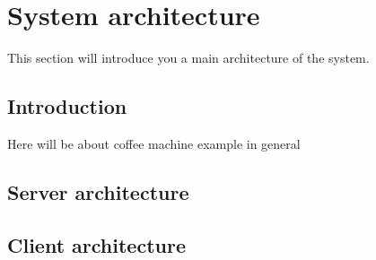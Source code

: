 \newpage
\section{System architecture}
This section will introduce you a main architecture of the system.

\subsection{Introduction}
Here will be about coffee machine example in general

\subsection{Server architecture}
\subsection{Client architecture}